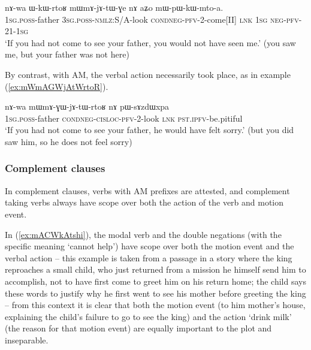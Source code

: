 \begin{exe}
\ex \label{ex:mWmAjAtWGe}
\gll nɤ-wa ɯ-kɯ-rtoʁ mɯ\redp{}mɤ-jɤ-tɯ-ɣe nɤ aʑo mɯ-pɯ-kɯ-mto-a. \\
\textsc{1sg.poss}-father \textsc{3sg.poss-}\textsc{nmlz}:S/A-look \textsc{cond}\redp{}\textsc{neg}-\textsc{pfv}-2-come[II] \textsc{lnk} \textsc{1sg} \textsc{neg}-\textsc{pfv}-2\fl{}1-\textsc{1sg} \\
\glt `If you had not come to see your father, you would not have seen me.' (you saw me, but your father was not here)
\end{exe}

By contrast, with AM, the verbal action necessarily took place, as in example (\ref{ex:mWmAGWjAtWrtoR}).

\begin{exe}
\ex \label{ex:mWmAGWjAtWrtoR}
\gll nɤ-wa  mɯ\redp{}mɤ-ɣɯ-jɤ-tɯ-rtoʁ nɤ pɯ-sɤzdɯxpa \\
\textsc{1sg.poss}-father \textsc{cond}\redp{}\textsc{neg}-\textsc{cisloc}-\textsc{pfv}-2-look \textsc{lnk} \textsc{pst.ipfv}-be.pitiful \\ 
\glt `If you had not come to see your father, he would have felt sorry.' (but you did saw him, so he does not feel sorry)
\end{exe}

\subsubsection{Complement clauses} \label{sec:am.conditional}
In complement clauses, verbs with AM prefixes are attested, and complement taking verbs always have scope over both the action of the verb and motion event.

 
In (\ref{ex:mACWkAtshi}), the modal verb  and the double negations (with the specific meaning `cannot help') have scope over both the motion event and the verbal action -- this example is taken from a passage in a story where the king reproaches a small child, who just returned from a mission he himself send him to accomplish, not to have first come to greet him on his return home; the child says these words to justify why he first went to see his mother before greeting the king -- from this context it is clear that both the motion event (to him mother's house, explaining the child's failure to go to see the king) and the action `drink milk' (the reason for that motion event) are equally important to the plot and inseparable. 

